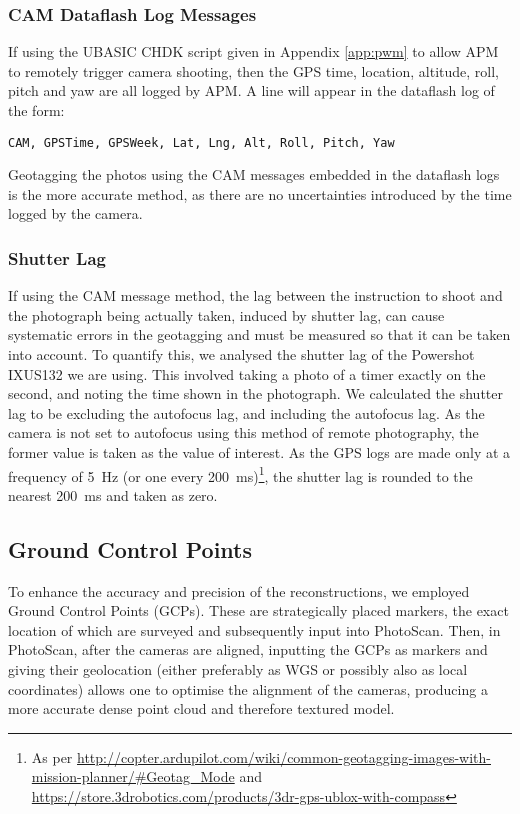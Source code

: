 \subsubsection{CAM Dataflash Log Messages}

If using the UBASIC CHDK script given in Appendix \ref{app:pwm} to allow APM to
remotely trigger camera shooting, then the GPS time, location, altitude, roll,
pitch and yaw are all logged by APM. A line will appear in the dataflash log of
the form:

\begin{verbatim}
CAM, GPSTime, GPSWeek, Lat, Lng, Alt, Roll, Pitch, Yaw
\end{verbatim}

Geotagging the photos using the CAM messages embedded in the dataflash logs is
the more accurate method, as there are no uncertainties introduced by the time
logged by the camera. 

\subsubsection{Shutter Lag}

If using the CAM message method, the lag between the instruction to shoot and
the photograph being actually taken, induced by shutter lag, can cause
systematic errors in the geotagging and must be measured so that it can be taken
into account. To quantify this, we analysed the shutter lag of the Powershot
IXUS132 we are using. This involved taking a photo of a
timer exactly on the second, and
noting the time shown in the photograph. We calculated the shutter lag to be
 excluding the autofocus lag, and 
including the autofocus lag. As the camera is not set to autofocus using this
method of remote photography, the former value is taken as the value of
interest. As the GPS logs are made only at a frequency of \SI{5}{Hz} (or one
every \SI{200}{ms})\footnote{As per
\url{http://copter.ardupilot.com/wiki/common-geotagging-images-with-mission-planner/\#Geotag_Mode}
and \url{https://store.3drobotics.com/products/3dr-gps-ublox-with-compass}}, the
shutter lag is rounded to the nearest \SI{200}{ms} and taken as zero.

\subsection{Ground Control Points}

To enhance the accuracy and precision of the reconstructions, we employed Ground
Control Points (GCPs). These are strategically placed markers, the exact
location of which are surveyed and subsequently input into PhotoScan. Then, in
PhotoScan, after the cameras are aligned, inputting the GCPs as markers and
giving their geolocation (either preferably as WGS or possibly also as local
coordinates) allows one to optimise the alignment of the cameras, producing a
more accurate dense point cloud and therefore textured model.

